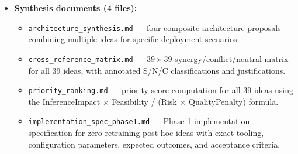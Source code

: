 \documentclass[11pt]{article}
\begin{document}
\begin{itemize}
    \item \textbf{Synthesis documents (4 files):}
    \begin{itemize}
        \item \texttt{architecture\_synthesis.md} --- four composite architecture proposals combining multiple ideas for specific deployment scenarios.
        \item \texttt{cross\_reference\_matrix.md} --- $39 \times 39$ synergy/conflict/neutral matrix for all 39 ideas, with annotated S/N/C classifications and justifications.
        \item \texttt{priority\_ranking.md} --- priority score computation for all 39 ideas using the InferenceImpact $\times$ Feasibility / (Risk $\times$ QualityPenalty) formula.
        \item \texttt{implementation\_spec\_phase1.md} --- Phase 1 implementation specification for zero-retraining post-hoc ideas with exact tooling, configuration parameters, expected outcomes, and acceptance criteria.
    \end{itemize}

\end{itemize}



\end{document}

